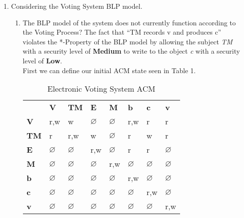 \documentclass[journal,onecolumn]{IEEEtran}
\begin{document}
\begin{enumerate}
  \item Considering the Voting System BLP model. 
    \begin{enumerate}
      \item The BLP model of the system does not currently function according to the Voting Process? The fact that ``TM records v and produces c'' violates the *-Property of the BLP model by allowing the subject \textit{TM} with a security level of \textbf{Medium} to write to the object \textit{c} with a security level of \textbf{Low}. \\
      
      First we can define our initial ACM state seen in Table 1.\\

      \begin{table}[]
        \centering
        \caption{Electronic Voting System ACM}
        \label{tab:initial-acm}
        \begin{tabular}{llllllll}
          & \textbf{V}    & \textbf{TM}   & \textbf{E}    & \textbf{M}    & \textbf{b}    & \textbf{c}               & \textbf{v}    \\
          \textbf{V}  & r,w           & w             & $\varnothing$ & $\varnothing$ & r,w           & r                        & r             \\
          \textbf{TM} & r             & r,w           & w             & $\varnothing$ & r             & {\color[HTML]{FE0000} w} & r             \\
          \textbf{E}  & $\varnothing$ & $\varnothing$ & r,w           & $\varnothing$ & r             & r                        & $\varnothing$ \\
          \textbf{M}  & $\varnothing$ & $\varnothing$ & $\varnothing$ & r,w           & $\varnothing$ & $\varnothing$            & $\varnothing$ \\
          \textbf{b}  & $\varnothing$ & $\varnothing$ & $\varnothing$ & $\varnothing$ & r,w           & $\varnothing$            & $\varnothing$ \\
          \textbf{c}  & $\varnothing$ & $\varnothing$ & $\varnothing$ & $\varnothing$ & $\varnothing$ & r,w                      & $\varnothing$ \\
          \textbf{v}  & $\varnothing$ & $\varnothing$ & $\varnothing$ & $\varnothing$ & $\varnothing$ & $\varnothing$            & r,w          
          \end{tabular}
        \end{table}
      

\end{enumerate}
\end{enumerate}
\end{document}
